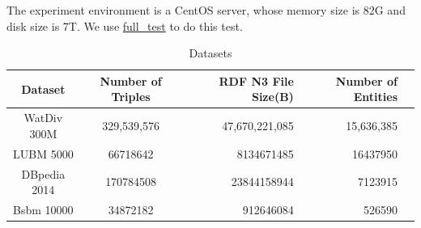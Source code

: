 \documentclass[titlepage, a4paper, 12pt]{article}
\begin{document}
The experiment environment is a CentOS server, whose memory size is 82G
and disk size is 7T. We use
\href{run:../../test/full_test.sh}{full\_test}
to do this test.

\begin{table}[b]
	\small
	\centering
	\caption{Datasets}
	\begin{tabular}{|c|c|r|r|r|}
		\hline
		Dataset& Number of Triples& RDF N3 File Size(B)  & Number of Entities\\
		\hline  
		\hline
		WatDiv 300M & 329,539,576  & 47,670,221,085 & 15,636,385 \\
		\hline
		LUBM 5000 & 66718642 & 8134671485 & 16437950 \\
		\hline
		DBpedia 2014 & 170784508 & 23844158944 & 7123915 \\
		\hline
		Bsbm 10000 & 34872182 & 912646084  & 526590 \\
		\hline
	\end{tabular}
	\label{table:datasets}
\end{table}


\end{document}
